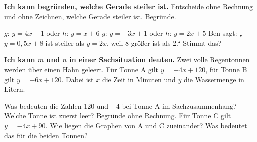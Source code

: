 \begin{aufgabe}{\textbf{Ich kann begründen, welche Gerade steiler ist.} Entscheide ohne Rechnung und ohne Zeichnen, welche Gerade steiler ist. Begründe.}
\begin{teile}
\teil $g$: $y = 4x - 1$ \quad oder \quad $h$: $y = x + 6$
\teil $g$: $y = -3x + 1$ \quad oder \quad $h$: $y = 2x + 5$
\teil Ben sagt: „$y = 0{,}5x + 8$ ist steiler als $y = 2x$, weil 8 größer ist als 2.“ Stimmt das?
\end{teile}
\end{aufgabe}

\begin{aufgabe}{\textbf{Ich kann $m$ und $n$ in einer Sachsituation deuten.} Zwei volle Regentonnen werden über einen Hahn geleert. Für Tonne A gilt $y = -4x + 120$, für Tonne B gilt $y = -6x + 120$. Dabei ist $x$ die Zeit in Minuten und $y$ die Wassermenge in Litern.}
\begin{teile}
\teil Was bedeuten die Zahlen 120 und $-4$ bei Tonne A im Sachzusammenhang?
\teil Welche Tonne ist zuerst leer? Begründe ohne Rechnung.
\teil Für Tonne C gilt $y = -4x + 90$. Wie liegen die Graphen von A und C zueinander? Was bedeutet das für die beiden Tonnen?
\end{teile}
\end{aufgabe}

